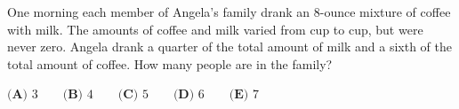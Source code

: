 One morning each member of Angela's family drank an $8$-ounce mixture of coffee with milk. The amounts of coffee and milk varied from cup to cup, but were never zero. Angela drank a quarter of the total amount of milk and a sixth of the total amount of coffee. How many people are in the family?

$\textbf{(A) } 3 \qquad \textbf{(B) } 4 \qquad \textbf{(C) } 5 \qquad \textbf{(D) } 6 \qquad \textbf{(E) } 7$
